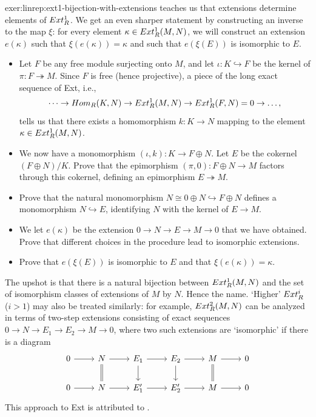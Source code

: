 \begin{exer}{}{exer:linrep:ext1-bijection-with-extensions}
   teaches us that
  extensions determine elements of $Ext^1_R$. We get an even sharper
  statement by constructing an inverse to the map $\xi$: for every
  element $\kappa \in Ext^1_R(M, N)$, we will construct an extension
  $e(\kappa)$ such that $\xi(e(\kappa)) = \kappa$ and such that
  $e(\xi(E))$ is isomorphic to $E$.
  \begin{itemize}
  \item Let $F$ be any free module surjecting onto $M$, and let
    $\iota : K \hookrightarrow F$ be the kernel of
    $\pi : F \twoheadrightarrow M$. Since $F$ is free (hence
    projective), a piece of the long exact sequence of Ext, i.e.,
    \[
      \dots \to Hom_R(K, N) \to Ext^1_R(M, N) \to Ext^1_R(F, N) = 0
      \to \dots,
    \]
    tells us that there exists a homomorphism $k : K \to N$ mapping to
    the element $\kappa \in Ext^1_R(M, N)$.
  \item We now have a monomorphism $(\iota, k) : K \to F \oplus N$.
    Let $E$ be the cokernel $(F \oplus N)/K$. Prove that the
    epimorphism $(\pi, 0) : F \oplus N \to M$ factors through this
    cokernel, defining an epimorphism $E \twoheadrightarrow M$.
  \item Prove that the natural monomorphism
    $N \cong 0 \oplus N \hookrightarrow F \oplus N$ defines a
    monomorphism $N \hookrightarrow E$, identifying $N$ with the
    kernel of $E \to M$.
  \item We let $e(\kappa)$ be the extension
    $0 \to N \to E \to M \to 0$ that we have obtained. Prove that
    different choices in the procedure lead to isomorphic extensions.
  \item Prove that $e(\xi(E))$ is isomorphic to $E$ and that
    $\xi(e(\kappa)) = \kappa$.
  \end{itemize}
  The upshot is that there is a natural bijection between
  $Ext^1_R(M, N)$ and the set of isomorphism classes of extensions of
  $M$ by $N$. Hence the name. `Higher' $Ext^i_R$ ($i > 1$) may also
  be treated similarly: for example, $Ext^2_R(M, N)$ can be analyzed
  in terms of two-step extensions consisting of exact sequences
  $0 \to N \to E_1 \to E_2 \to M \to 0$, where two such extensions are
  `isomorphic' if there is a diagram
  \[
    \begin{tikzcd}
      0 \ar[r] & N \ar[r] \ar[d, equal] & E_1 \ar[r] \ar[d] &
      E_2 \ar[r] \ar[d] & M \ar[r] \ar[d, equal] & 0 \\
      0 \ar[r] & N \ar[r] & E_1' \ar[r] & E_2' \ar[r] & M \ar[r] & 0
    \end{tikzcd}
  \]
  This approach to Ext is attributed to .
\end{exer}


